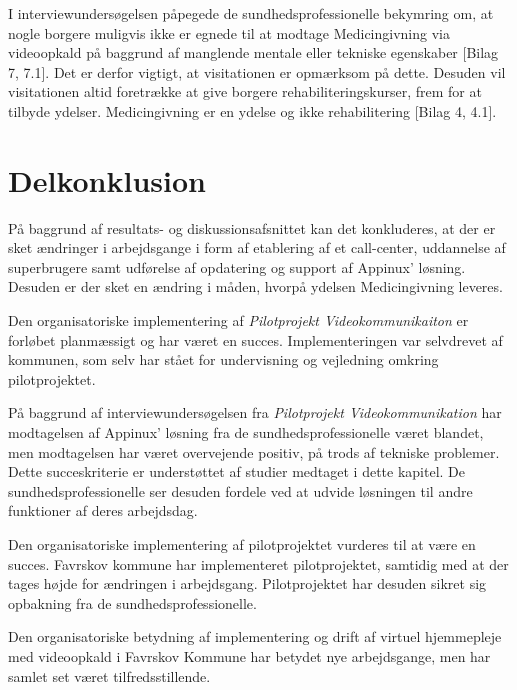 I interviewundersøgelsen påpegede de sundhedsprofessionelle bekymring om, at nogle borgere muligvis ikke er egnede til at modtage Medicingivning via videoopkald på baggrund af manglende mentale eller tekniske egenskaber [Bilag 7, 7.1]. Det er derfor vigtigt, at visitationen er opmærksom på dette. Desuden vil visitationen altid foretrække at give borgere rehabiliteringskurser, frem for at tilbyde ydelser. Medicingivning er en ydelse og ikke rehabilitering [Bilag 4, 4.1].

\section{Delkonklusion}
På baggrund af resultats- og diskussionsafsnittet kan det konkluderes, at der er sket ændringer i arbejdsgange i form af etablering af et call-center, uddannelse af superbrugere samt udførelse af opdatering og support af Appinux' løsning. Desuden er der sket en ændring i måden, hvorpå ydelsen Medicingivning leveres.

Den organisatoriske implementering af \textit{Pilotprojekt Videokommunikaiton} er forløbet planmæssigt og har været en succes. Implementeringen var selvdrevet af kommunen, som selv har stået for undervisning og vejledning omkring pilotprojektet.

På baggrund af interviewundersøgelsen fra \textit{Pilotprojekt Videokommunikation} har modtagelsen af Appinux' løsning fra de sundhedsprofessionelle været blandet, men modtagelsen har været overvejende positiv, på trods af tekniske problemer. Dette succeskriterie er understøttet af studier medtaget i dette kapitel. De sundhedsprofessionelle ser desuden fordele ved at udvide løsningen til andre funktioner af deres arbejdsdag. 

Den organisatoriske implementering af pilotprojektet vurderes til at være en succes. Favrskov kommune har implementeret pilotprojektet, samtidig med at der tages højde for ændringen i arbejdsgang. Pilotprojektet har desuden sikret sig opbakning fra de sundhedsprofessionelle.

Den organisatoriske betydning af implementering og drift af virtuel hjemmepleje med videoopkald i Favrskov Kommune har betydet nye arbejdsgange, men har samlet set været tilfredsstillende.  